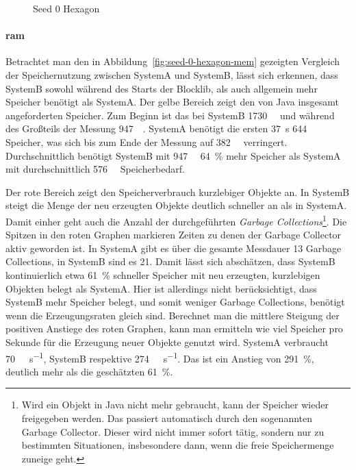 \begin{figure}[!htbp]
	\caption{Seed 0 Hexagon}\label{fig:seed-0-hexagon-mem}
\end{figure} 
\paragraph{\ac{ram}} Betrachtet man den in Abbildung~\vref{fig:seed-0-hexagon-mem} gezeigten Vergleich der Speichernutzung zwischen SystemA und SystemB, lässt sich erkennen, dass SystemB sowohl während des Starts der Blocklib, als auch allgemein mehr Speicher benötigt als SystemA. Der gelbe Bereich zeigt den von Java insgesamt angeforderten Speicher. Zum Beginn ist das bei SystemB \SI{1730}{\mega\byte} und während des Großteils der Messung \SI{947}{\mega\byte}. SystemA benötigt die ersten \SI{37}{\second} \SI{644}{\mega\byte} Speicher, was sich bis zum Ende der Messung auf \SI{382}{\mega\byte} verringert. Durchschnittlich benötigt SystemB mit \SI{947}{\mega\byte} \SI{64}{\percent} mehr Speicher als SystemA mit durchschnittlich \SI{576}{\mega\byte} Speicherbedarf.

Der rote Bereich zeigt den Speicherverbrauch kurzlebiger Objekte an. In SystemB steigt die Menge der neu erzeugten Objekte deutlich schneller an als in SystemA. Damit einher geht auch die Anzahl der durchgeführten \emph{Garbage Collections}\footnote{Wird ein Objekt in Java nicht mehr gebraucht, kann der Speicher wieder freigegeben werden. Das passiert automatisch durch den sogenannten Garbage Collector. Dieser wird nicht immer sofort tätig, sondern nur zu bestimmten Situationen, insbesondere dann, wenn die freie Speichermenge zuneige geht.}. Die Spitzen in den roten Graphen markieren Zeiten zu denen der Garbage Collector aktiv geworden ist. In SystemA gibt es über die gesamte Messdauer 13 Garbage Collections, in SystemB sind es 21. Damit lässt sich abschätzen, dass SystemB kontinuierlich etwa \SI{61}{\percent} schneller Speicher mit neu erzeugten, kurzlebigen Objekten belegt als SystemA. Hier ist allerdings nicht berücksichtigt, dass SystemB mehr Speicher belegt, und somit  weniger Garbage Collections, benötigt wenn die Erzeugungsraten gleich sind. Berechnet man die mittlere Steigung der positiven Anstiege des roten Graphen, kann man ermitteln wie viel Speicher pro Sekunde für die Erzeugung neuer Objekte genutzt wird. SystemA verbraucht \SI{70}{\mega\byte\per\second}, SystemB respektive \SI{274}{\mega\byte\per\second}. Das ist ein Anstieg von \SI{291}{\percent}, deutlich mehr als die geschätzten \SI{61}{\percent}.